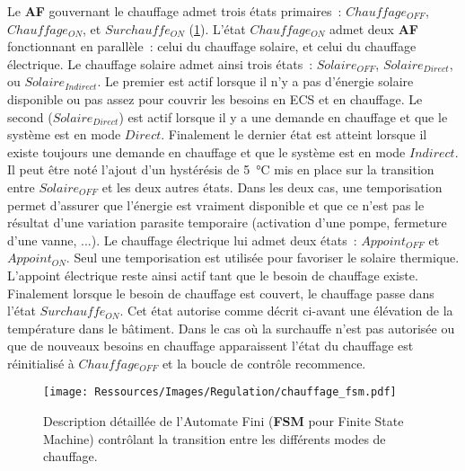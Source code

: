 Le \textbf{AF} gouvernant le chauffage admet trois états primaires~: $Chauffage_{OFF}$,
$Chauffage_{ON}$, et $Surchauffe_{ON}$ (\ref{fig:automate_chauffage}). L’état
$Chauffage_{ON}$ admet deux \textbf{AF} fonctionnant en parallèle~: celui du chauffage
solaire, et celui du chauffage électrique. Le chauffage solaire admet ainsi trois états~:
$Solaire_{OFF}$, $Solaire_{Direct}$, ou $Solaire_{Indirect}$. Le premier est actif lorsque
il n’y a pas d’énergie solaire disponible ou pas assez pour couvrir les besoins en ECS et
en chauffage. Le second ($Solaire_{Direct}$) est actif lorsque il y a une demande en
chauffage et que le système est en mode $Direct$. Finalement le dernier état est atteint
lorsque il existe toujours une demande en chauffage et que le système est en mode
$Indirect$.
Il peut être noté l’ajout d’un hystérésis de \SI{5}{\celsius} mis en place sur la
transition entre $Solaire_{OFF}$ et les deux autres états. Dans les deux cas, une
temporisation permet d’assurer que l’énergie est vraiment disponible et que ce n’est pas
le résultat d’une variation parasite temporaire (activation d’une pompe, fermeture d’une
vanne, ...). Le chauffage électrique lui admet deux états~: $Appoint_{OFF}$ et
$Appoint_{ON}$. Seul une temporisation est utilisée pour favoriser le solaire thermique.
L’appoint électrique reste ainsi actif tant que le besoin de chauffage existe. Finalement
lorsque le besoin de chauffage est couvert, le chauffage passe dans l’état
$Surchauffe_{ON}$. Cet état autorise comme décrit ci-avant une élévation de la température
dans le bâtiment. Dans le cas où la surchauffe n’est pas autorisée ou que de nouveaux
besoins en chauffage apparaissent l’état du chauffage est réinitialisé à $Chauffage_{OFF}$
et la boucle de contrôle recommence.

\begin{figure}
    \begin{center}
        \texttt{[image: Ressources/Images/Regulation/chauffage\_fsm.pdf]}
    \end{center}
    \caption{Description détaillée de l’Automate Fini (\textbf{FSM} pour Finite State Machine)
             contrôlant la transition entre les différents modes de chauffage.
             \label{fig:automate_chauffage}}
\end{figure}


